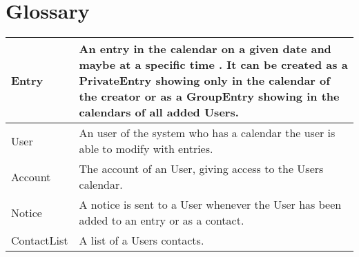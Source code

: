 \section{Glossary}
\begin{center}
    \begin{tabular}{ | l | p{10cm} |}
    \hline
    Entry & An entry in the calendar on a given date and maybe at a specific time . It can be created as a PrivateEntry showing only in the calendar of the creator or as a GroupEntry showing in the calendars of all added Users. \\ \hline
    User & An user of the system who has a calendar the user is able to modify with entries. \\ \hline
    Account & The account of an User, giving access to the Users calendar. \\ \hline
    Notice & A notice is sent to a User whenever the User has been added to an entry or as a contact. \\ \hline
	ContactList & A list of a Users contacts. \\ \hline
    \end{tabular}
\end{center}